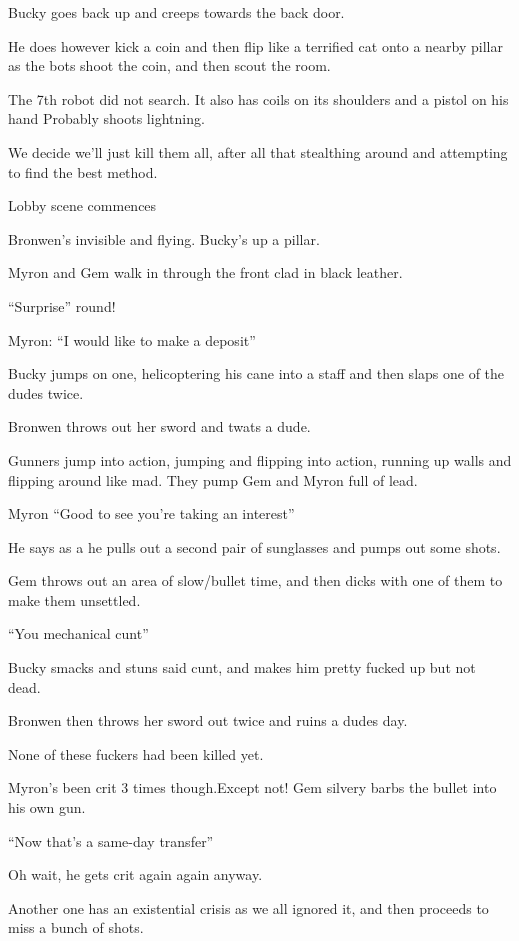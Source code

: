 Bucky goes back up and creeps towards the back door.\medskip

He does however kick a coin and then flip like a terrified cat onto a nearby pillar as the bots shoot the coin, and then scout the room.\medskip

The 7th robot did not search. It also has coils on its shoulders and a pistol on his hand Probably shoots lightning.\medskip

We decide we’ll just kill them all, after all that stealthing around and attempting to find the best method.\medskip

Lobby scene commences\medskip

Bronwen’s invisible and flying. Bucky’s up a pillar.\medskip

Myron and Gem walk in through the front clad in black leather.\medskip

“Surprise” round!\medskip

Myron: “I would like to make a deposit”\medskip

Bucky jumps on one, helicoptering his cane into a staff and then slaps one of the dudes twice.\medskip

Bronwen throws out her sword and twats a dude.\medskip

Gunners jump into action, jumping and flipping into action, running up walls and flipping around like mad. They pump Gem and Myron full of lead.\medskip

Myron “Good to see you’re taking an interest”\medskip

He says as a he pulls out a second pair of sunglasses and pumps out some shots.\medskip

Gem throws out an area of slow/bullet time, and then dicks with one of them to make them unsettled.\medskip

“You mechanical cunt”\medskip

Bucky smacks and stuns said cunt, and makes him pretty fucked up but not dead.\medskip

Bronwen then throws her sword out twice and ruins a dudes day.\medskip

None of these fuckers had been killed yet.\medskip

Myron’s been crit 3 times though.Except not! Gem silvery barbs the bullet into his own gun.\medskip

“Now that’s a same-day transfer”\medskip

Oh wait, he gets crit again again anyway.\medskip

Another one has an existential crisis as we all ignored it, and then proceeds to miss a bunch of shots.\medskip

